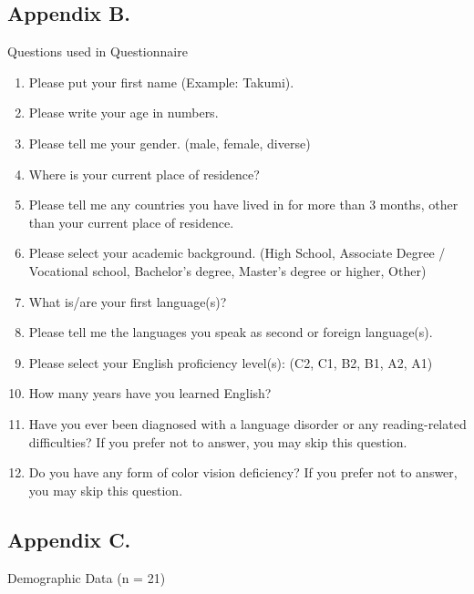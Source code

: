 \documentclass[
]{article}
\begin{document}
\newpage

\subsection*{Appendix B.}\label{appendix-b.}

\noindent Questions used in Questionnaire

\vspace{1em}

\begin{enumerate}
\def\labelenumi{\arabic{enumi}.}
\item
  Please put your first name (Example: Takumi).
\item
  Please write your age in numbers.
\item
  Please tell me your gender. (male, female, diverse)
\item
  Where is your current place of residence?
\item
  Please tell me any countries you have lived in for more than 3 months,
  other than your current place of residence.
\item
  Please select your academic background. (High School, Associate Degree
  / Vocational school, Bachelor's degree, Master's degree or higher,
  Other)
\item
  What is/are your first language(s)?
\item
  Please tell me the languages you speak as second or foreign
  language(s).
\item
  Please select your English proficiency level(s): (C2, C1, B2, B1, A2,
  A1)
\item
  How many years have you learned English?
\item
  Have you ever been diagnosed with a language disorder or any
  reading-related difficulties? If you prefer not to answer, you may
  skip this question.
\item
  Do you have any form of color vision deficiency? If you prefer not to
  answer, you may skip this question.
\end{enumerate}

\newpage

\subsection*{Appendix C.}\label{appendix-c.}

\noindent Demographic Data (n = 21)
\end{document}
